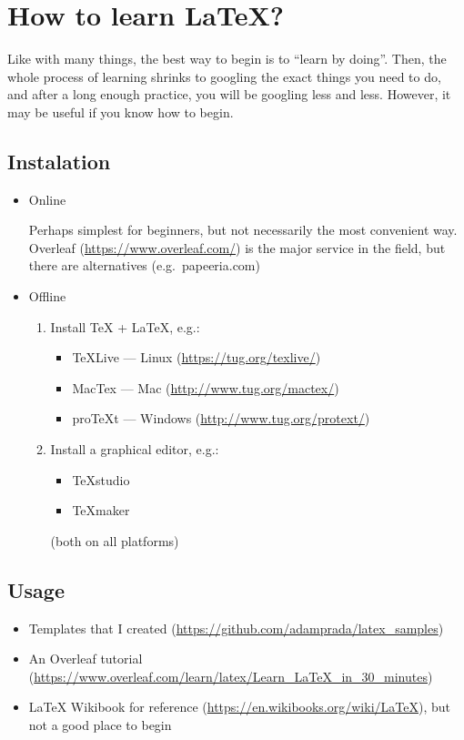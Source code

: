 \documentclass[11pt]{article}
\begin{document}
\section{How to learn \LaTeX?}
Like with many things, the best way to begin is to ``learn by doing''. Then, the whole process of learning shrinks to googling the exact things you need to do, and after a long enough practice, you will be googling less and less. However, it may be useful if you know how to begin.

\subsection{Instalation}
\begin{itemize}
	\item Online
	
	Perhaps simplest for beginners, but not necessarily the most convenient way. Overleaf (\url{https://www.overleaf.com/}) is the major service in the field, but there are alternatives (e.g.~papeeria.com)
	\item Offline
	
	\begin{enumerate}
		\item Install TeX + LaTeX, e.g.:
		\begin{itemize}
			\item TeXLive --- Linux (\url{https://tug.org/texlive/})
			\item MacTex --- Mac (\url{http://www.tug.org/mactex/})
			\item proTeXt --- Windows (\url{http://www.tug.org/protext/})
		\end{itemize}
		\item Install a graphical editor, e.g.:
		\begin{itemize}
			\item TeXstudio
			\item TeXmaker
		\end{itemize}
		(both on all platforms)
	\end{enumerate}
\end{itemize}

\subsection{Usage}
\begin{itemize}
	\item Templates that I created (\url{https://github.com/adamprada/latex_samples})
	\item An Overleaf tutorial (\url{https://www.overleaf.com/learn/latex/Learn_LaTeX_in_30_minutes})
	\item LaTeX Wikibook for reference (\url{https://en.wikibooks.org/wiki/LaTeX}), but not a good place to begin
\end{itemize}
\end{document}
